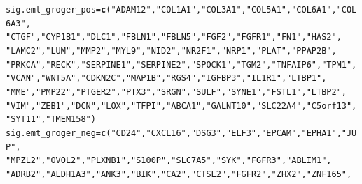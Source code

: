 \documentclass{article}\usepackage[]{graphicx}\usepackage[]{color}
\makeatletter
\newcommand{\hlstr}[1]{\textcolor[rgb]{0.192,0.494,0.8}{#1}}%
\newcommand{\hlstd}[1]{\textcolor[rgb]{0.345,0.345,0.345}{#1}}%
\newcommand{\hlkwb}[1]{\textcolor[rgb]{0.69,0.353,0.396}{#1}}%
\newcommand{\hlkwd}[1]{\textcolor[rgb]{0.737,0.353,0.396}{\textbf{#1}}}%
\newenvironment{kframe}{%
 \def\at@end@of@kframe{}%
 \ifinner\ifhmode%
  \def\at@end@of@kframe{\end{minipage}}%
  \begin{minipage}{\columnwidth}%
 \fi\fi%
 \def\FrameCommand##1{\hskip\@totalleftmargin \hskip-\fboxsep
 \colorbox{shadecolor}{##1}\hskip-\fboxsep
     \hskip-\linewidth \hskip-\@totalleftmargin \hskip\columnwidth}%
 \MakeFramed {\advance\hsize-\width
   \@totalleftmargin\z@ \linewidth\hsize
   \@setminipage}}%
 {\par\unskip\endMakeFramed%
 \at@end@of@kframe}
\newenvironment{knitrout}{}{} %
\makeatother
\begin{document}
\begin{knitrout}
\color{fgcolor}\begin{kframe}
\begin{alltt}
\hlstd{sig.emt_groger_pos} \hlkwb{=} \hlkwd{c}\hlstd{(}\hlstr{"ADAM12"}\hlstd{,} \hlstr{"COL1A1"}\hlstd{,} \hlstr{"COL3A1"}\hlstd{,} \hlstr{"COL5A1"}\hlstd{,} \hlstr{"COL6A1"}\hlstd{,} \hlstr{"COL6A3"}\hlstd{,}
    \hlstr{"CTGF"}\hlstd{,} \hlstr{"CYP1B1"}\hlstd{,} \hlstr{"DLC1"}\hlstd{,} \hlstr{"FBLN1"}\hlstd{,} \hlstr{"FBLN5"}\hlstd{,} \hlstr{"FGF2"}\hlstd{,} \hlstr{"FGFR1"}\hlstd{,} \hlstr{"FN1"}\hlstd{,} \hlstr{"HAS2"}\hlstd{,}
    \hlstr{"LAMC2"}\hlstd{,} \hlstr{"LUM"}\hlstd{,} \hlstr{"MMP2"}\hlstd{,} \hlstr{"MYL9"}\hlstd{,} \hlstr{"NID2"}\hlstd{,} \hlstr{"NR2F1"}\hlstd{,} \hlstr{"NRP1"}\hlstd{,} \hlstr{"PLAT"}\hlstd{,} \hlstr{"PPAP2B"}\hlstd{,}
    \hlstr{"PRKCA"}\hlstd{,} \hlstr{"RECK"}\hlstd{,} \hlstr{"SERPINE1"}\hlstd{,} \hlstr{"SERPINE2"}\hlstd{,} \hlstr{"SPOCK1"}\hlstd{,} \hlstr{"TGM2"}\hlstd{,} \hlstr{"TNFAIP6"}\hlstd{,} \hlstr{"TPM1"}\hlstd{,}
    \hlstr{"VCAN"}\hlstd{,} \hlstr{"WNT5A"}\hlstd{,} \hlstr{"CDKN2C"}\hlstd{,} \hlstr{"MAP1B"}\hlstd{,} \hlstr{"RGS4"}\hlstd{,} \hlstr{"IGFBP3"}\hlstd{,} \hlstr{"IL1R1"}\hlstd{,} \hlstr{"LTBP1"}\hlstd{,}
    \hlstr{"MME"}\hlstd{,} \hlstr{"PMP22"}\hlstd{,} \hlstr{"PTGER2"}\hlstd{,} \hlstr{"PTX3"}\hlstd{,} \hlstr{"SRGN"}\hlstd{,} \hlstr{"SULF"}\hlstd{,} \hlstr{"SYNE1"}\hlstd{,} \hlstr{"FSTL1"}\hlstd{,} \hlstr{"LTBP2"}\hlstd{,}
    \hlstr{"VIM"}\hlstd{,} \hlstr{"ZEB1"}\hlstd{,} \hlstr{"DCN"}\hlstd{,} \hlstr{"LOX"}\hlstd{,} \hlstr{"TFPI"}\hlstd{,} \hlstr{"ABCA1"}\hlstd{,} \hlstr{"GALNT10"}\hlstd{,} \hlstr{"SLC22A4"}\hlstd{,} \hlstr{"C5orf13"}\hlstd{,}
    \hlstr{"SYT11"}\hlstd{,} \hlstr{"TMEM158"}\hlstd{)}
\hlstd{sig.emt_groger_neg} \hlkwb{=} \hlkwd{c}\hlstd{(}\hlstr{"CD24"}\hlstd{,} \hlstr{"CXCL16"}\hlstd{,} \hlstr{"DSG3"}\hlstd{,} \hlstr{"ELF3"}\hlstd{,} \hlstr{"EPCAM"}\hlstd{,} \hlstr{"EPHA1"}\hlstd{,} \hlstr{"JUP"}\hlstd{,}
    \hlstr{"MPZL2"}\hlstd{,} \hlstr{"OVOL2"}\hlstd{,} \hlstr{"PLXNB1"}\hlstd{,} \hlstr{"S100P"}\hlstd{,} \hlstr{"SLC7A5"}\hlstd{,} \hlstr{"SYK"}\hlstd{,} \hlstr{"FGFR3"}\hlstd{,} \hlstr{"ABLIM1"}\hlstd{,}
    \hlstr{"ADRB2"}\hlstd{,} \hlstr{"ALDH1A3"}\hlstd{,} \hlstr{"ANK3"}\hlstd{,} \hlstr{"BIK"}\hlstd{,} \hlstr{"CA2"}\hlstd{,} \hlstr{"CTSL2"}\hlstd{,} \hlstr{"FGFR2"}\hlstd{,} \hlstr{"ZHX2"}\hlstd{,} \hlstr{"ZNF165"}\hlstd{,}

\end{alltt}
\end{kframe}
\end{knitrout}
\end{document}
